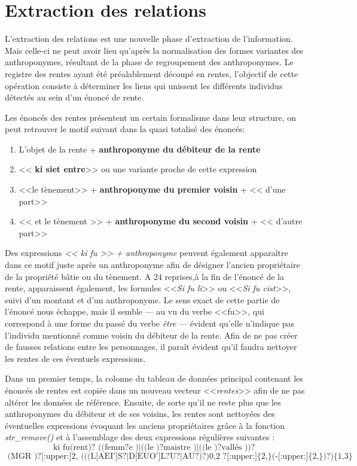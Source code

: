 \section{Extraction des relations}
L'extraction des relations est une nouvelle phase d'extraction de l'information. Mais celle-ci ne peut avoir lieu qu'après la normalisation des formes variantes des anthroponymes, résultant de la phase de regroupement des anthroponymes.
Le registre des rentes ayant été préalablement découpé en rentes, l'objectif de cette opération consiste à déterminer les liens qui unissent les différents individus détectés au sein d'un énoncé de rente.

Les énoncés des rentes présentent un certain formalisme dans leur structure, on peut retrouver le motif suivant dans la quasi totalisé des énoncés: 
\begin{enumerate}
\item L'objet de la rente +  \textbf{anthroponyme du débiteur de la rente}
\item << \textbf{ki siet entre}>> ou une variante proche de cette expression
\item <<le tènement>> +  \textbf{anthroponyme du premier voisin } + << d'une part>> 
\item << et le tènement >> + \textbf{anthroponyme du second voisin} + << d'autre part>>
\end{enumerate}
Des expressions \textit{<< ki fu >> + anthroponyme} peuvent également apparaître dans ce motif juste après un anthroponyme afin de désigner l'ancien propriétaire de la propriété bâtie ou du tènement. A 24 reprises,à la fin de l'énoncé de la rente, apparaissent également,  les formules <<\textit{Si fu li}>> ou <<\textit{Si fu cist}>>, suivi d'un montant et d'un anthroponyme. Le sens exact de cette partie de l'énoncé nous échappe, mais il semble --- au vu du verbe <<fu>>,  qui correspond à une forme du passé du verbe \textit{être} --- évident qu'elle n'indique pas l'individu mentionné comme voisin du débiteur de la rente. Afin de ne pas créer de fausses relations entre les personnages, il paraît évident qu'il faudra nettoyer les rentes de ces éventuels expressions.

Dans un premier temps, la colonne du tableau de données principal contenant les énoncés de rentes est copiée dans un nouveau vecteur <<\textit{rentes}>> afin de ne pas altérer les données de référence. Ensuite, de sorte qu'il ne reste plus que les anthroponymes du débiteur et de ses voisins, les rentes sont nettoyées des éventuelles expressions évoquant les anciens propriétaires grâce à la fonction \textit{str\_remove()} et à l'assemblage des deux expressions régulières suivantes : 
\[ \boxed{ 
    \text{ki fu(rent)? ((femm?e )|((le )?maistre )|((le )?vallés ))? }
    }
\]
\[ \boxed{ 
    \text{ 
        (MGR )?[:upper:]{2,} (((L[AEI']S?|D[EUO']L?U?|AU?)?){0,2} ?[:upper:]\{2,\}(-[:upper:]\{2,\})?)\{1,3\} }
    }
\]



